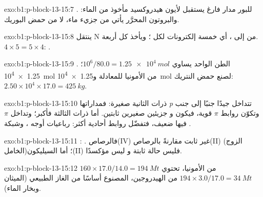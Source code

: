 \begin{solution}{exo:b1:p-block-13-15:7}
للبور مدار فارغ يستقبل  لأيون هيدروكسيد
مأخوذ من الماء: . والبروتون
المحرَّر يأتي من جزيء ماء، لا من حمض البوريك.
\end{solution}

\begin{solution}{exo:b1:p-block-13-15:8}
ينتقل N من  إلى ، أي خمسة إلكترونات لكل ؛ ويأخذ كل 
أربعة. $4 \times 5 = 5 \times 4$: .
\end{solution}

\begin{solution}{exo:b1:p-block-13-15:9}
. الطن الواحد يساوي $10^6/80.0 = \qty{1.25e4}{mol}$؛
\qty{1.25e4}{mol} من الأمونيا للمعادلة و\qty{1.25e4}{mol} لصنع
حمض النتريك: $2.50 \times 10^4 \times 17.0 = \qty{425}{kg}$.
\end{solution}

\begin{solution}{exo:b1:p-block-13-15:10}
ذرات  الثانية صغيرة: فمداراتها \textit{p} تتداخل جيدًا جنبًا
إلى جنب وتكوّن روابط $\pi$ قوية، فيكون  و جزيئين صغيرين
ثابتين. أما ذرات  الثالثة فأكبر؛ وتداخل $\pi$ فيها
ضعيف، فتفضّل روابط أحادية أكثر: رباعيات أوجه ،
وشبكة .
\end{solution}

\begin{solution}{exo:b1:p-block-13-15:11}
:
. فالرصاص(IV) غير ثابت
مقارنةً بالرصاص(II) (الزوج الخامل)؛ أما السيليكون(II) فليس حالة ثابتة
و ليس مؤكسدًا.
\end{solution}

\begin{solution}{exo:b1:p-block-13-15:12}
$160 \times 17.0/14.0 = \qty{194}{Mt}$ من الأمونيا، تحتوي $194 \times
3.0/17.0 = \qty{34}{Mt}$ من الهيدروجين، المصنوع أساسًا من الغاز الطبيعي
(الميثان وبخار الماء).
\end{solution}

